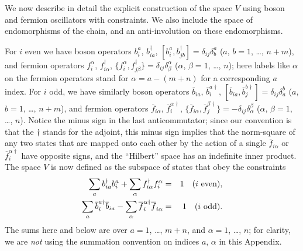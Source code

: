 \documentclass[twocolumn,floats,pra]{revtex4}
\begin{document}
We now describe in detail the explicit construction of the space
$V$ using boson and fermion oscillators with constraints. We also
include the space of endomorphisms of the chain, and an
anti-involution on these endomorphisms.


For $i$ even we have boson operators $b_i^a$, $b_{ia}^\dagger$,
$[b_i^a,b_{jb}^\dagger]=\delta_{ij}\delta_b^a$ ($a$, $b=1$,
\ldots, $n+m$), and fermion operators $f_i^\alpha$,
$f_{i\alpha}^\dagger$,
$\{f_i^\alpha,f_{j\beta}^\dagger\}=\delta_{ij}\delta_\beta^\alpha$
($\alpha$, $\beta=1$, \ldots, $n$); here labels like $\alpha$ on
the fermion operators stand for $\alpha=a-(m+n)$ for a
corresponding $a$ index. For $i$ odd, we have similarly boson
operators $\overline{b}_{ia}$, $\overline{b}_i^{a\dagger}$,
$[\overline{b}_{ia},\overline{b}_j^{b\dagger}]=\delta_{ij}\delta^b_a$
($a$, $b=1$, \ldots, $n+m$), and fermion operators
$\overline{f}_{i\alpha}$, $\overline{f}_i^{\alpha\dagger}$,
$\{\overline{f}_{i\alpha},\overline{f}_j^{\beta\dagger}\}=
-\delta_{ij}\delta^\beta_\alpha$ ($\alpha$, $\beta=1$, \ldots,
$n$). Notice the minus sign in the last anticommutator; since our
convention is that the $\dagger$ stands for the adjoint, this
minus sign implies that the norm-square of any two states that are
mapped onto each other by the action of a single
$\overline{f}_{i\alpha}$ or $\overline{f}_i^{\alpha\dagger}$ have
opposite signs, and the ``Hilbert'' space has an indefinite inner
product. The space $V$ is now defined as the subspace of states
that obey the constraints
\begin{eqnarray}
\sum_ab_{ia}^\dagger b_i^a+\sum_\alpha f_{i\alpha}^\dagger
f_i^\alpha &=& 1 \quad (i\hbox{ even}),\\
\sum_a\overline{b}_i^{a\dagger}
\overline{b}_{ia}-\sum_\alpha\overline{f}_i^{\alpha\dagger}
\overline{f}_{i\alpha} &=& 1 \quad (i\hbox{ odd}).
\end{eqnarray}
The sums here and below are over $a=1$, \ldots, $m+n$, and
$\alpha=1$, \ldots, $n$; for clarity, we are {\em not} using the
summation convention on indices $a$, $\alpha$ in this Appendix.
\end{document}
